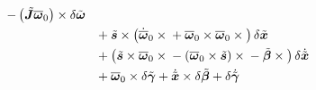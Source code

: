 \documentclass[10pt,fleqn,subeqn]{report}
\newcommand{\T}[1]{\bm{#1}}
\newcommand{\TT}[1]{\bm{#1}}
\begin{document}
\begin{subequations}
\begin{align}
{		- \plbr{\tilde{\TT{J}} \overline{\T{\omega}}_0} \times{}
	} \delta\tilde{\T{\omega}}
	\nonumber \\
	&\hphantom{=}
	+ \tilde{\T{s}} \times \plbr{
		\dot{\overline{\T{\omega}}}_0 \times{}
		+ \overline{\T{\omega}}_0 \times \overline{\T{\omega}}_0 \times{}
	} \delta\tilde{\T{x}}
	\nonumber \\
	&\hphantom{=}
	+ \plbr{
		\tilde{\T{s}} \times \overline{\T{\omega}}_0 \times{}
		- \plbr{\overline{\T{\omega}}_0 \times \tilde{\T{s}}} \times{}
		- \tilde{\T{\beta}} \times{}
	} \delta\dot{\tilde{\T{x}}}
	\nonumber \\
	&\hphantom{=}
	+ \overline{\T{\omega}}_0 \times \delta\tilde{\T{\gamma}}
	+ \dot{\tilde{\T{x}}} \times \delta\tilde{\T{\beta}}
	+ \delta\dot{\tilde{\T{\gamma}}}
\end{align}
\end{subequations}
\end{document}
